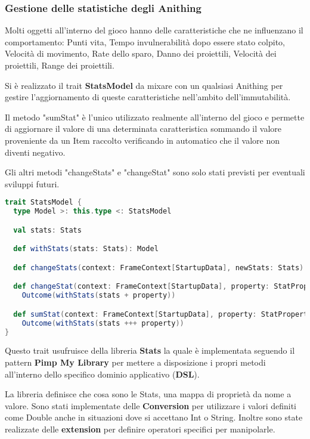 \subsubsection{Gestione delle statistiche degli Anithing}
Molti oggetti all'interno del gioco hanno delle caratteristiche che ne influenzano il comportamento: 
Punti vita, Tempo invulnerabilità dopo essere stato colpito, Velocità di movimento, Rate dello sparo, Danno dei proiettili, Velocità dei proiettili, Range dei proiettili.

Si è realizzato il trait \textbf{StatsModel} da mixare con un qualsiasi Anithing 
per gestire l'aggiornamento di queste caratteristiche nell'ambito dell'immutabilità.

Il metodo "sumStat" è l'unico utilizzato realmente all'interno del gioco e permette di 
aggiornare il valore di una determinata caratteristica sommando il valore proveniente da un Item raccolto 
verificando in automatico che il valore non diventi negativo.

Gli altri metodi "changeStats" e "changeStat" sono solo stati previsti per eventuali sviluppi futuri.  

\begin{lstlisting}[language=Scala]
trait StatsModel {
  type Model >: this.type <: StatsModel

  val stats: Stats

  def withStats(stats: Stats): Model

  def changeStats(context: FrameContext[StartupData], newStats: Stats): Outcome[Model] = Outcome(withStats(newStats))

  def changeStat(context: FrameContext[StartupData], property: StatProperty): Outcome[Model] =
    Outcome(withStats(stats + property))

  def sumStat(context: FrameContext[StartupData], property: StatProperty): Outcome[Model] =
    Outcome(withStats(stats +++ property))
}
\end{lstlisting}

Questo trait usufruisce della libreria \textbf{Stats} la quale è implementata seguendo il pattern \textbf{Pimp My Library} 
per mettere a disposizione i propri metodi all'interno dello specifico dominio applicativo (\textbf{DSL}).

La libreria definisce che cosa sono le Stats, una mappa di proprietà da nome a valore.
Sono stati implementate delle \textbf{Conversion} per utilizzare i valori definiti come Double anche in situazioni 
dove si accettano Int o String.
Inoltre sono state realizzate delle \textbf{extension} per definire operatori specifici per manipolarle.

